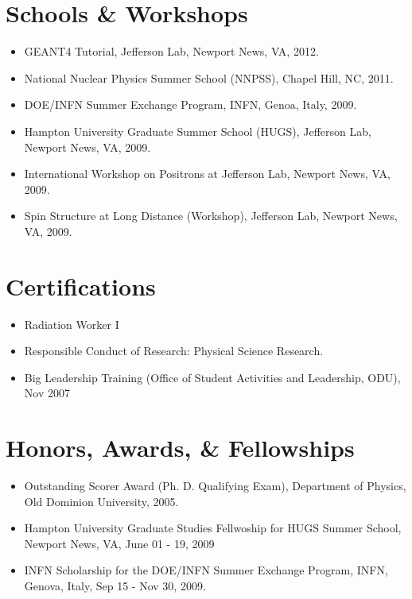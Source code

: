 \documentclass[10pt, letterpaper]{article}
\newcommand{\years}[1]{\marginnote{\small #1}} %
\begin{document}
\section*{Schools \& Workshops}
\noindent
\begin{itemize}
\item GEANT4 Tutorial, Jefferson Lab, Newport News, VA, 2012.
\item National Nuclear Physics Summer School (NNPSS), Chapel Hill, NC, 2011.
\item DOE/INFN Summer Exchange Program, INFN, Genoa, Italy, 2009.
\item Hampton University Graduate Summer School (HUGS), Jefferson Lab, Newport News, VA, 2009.
\item International Workshop on Positrons at Jefferson Lab, Newport News, VA, 2009. %
\item Spin Structure at Long Distance (Workshop), Jefferson Lab, Newport News, VA, 2009.
\end{itemize}



\section*{Certifications}
\noindent
\begin{itemize}
\item Radiation Worker I
\item Responsible Conduct of Research: Physical Science Research.
\item Big Leadership Training (Office of Student Activities and Leadership, ODU), Nov 2007
\end{itemize}




\section*{Honors, Awards, \& Fellowships}
\noindent
\begin{itemize}
\item Outstanding Scorer Award (Ph. D. Qualifying Exam), Department of Physics, Old Dominion University, 2005.
\item Hampton University Graduate Studies Fellwoship for HUGS Summer School, Newport News, VA, June 01 - 19, 2009
\item INFN Scholarship for the DOE/INFN Summer Exchange Program, INFN, Genova, Italy, Sep 15 - Nov 30, 2009.
\end{itemize}
\end{document}
